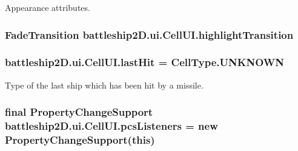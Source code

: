 Appearance attributes. 

\hypertarget{classbattleship2D_1_1ui_1_1CellUI_a5abb394f8190a79f8cb0d6b352af6333}{
\subsubsection[{highlight\-Transition}]{\setlength{\rightskip}{0pt plus 5cm}Fade\-Transition battleship2\-D.\-ui.\-Cell\-U\-I.\-highlight\-Transition\hspace{0.3cm}{\ttfamily [private]}}}\label{classbattleship2D_1_1ui_1_1CellUI_a5abb394f8190a79f8cb0d6b352af6333}
\hypertarget{classbattleship2D_1_1ui_1_1CellUI_a90990b04506f285810963675dfa2c668}{
\subsubsection[{last\-Hit}]{ battleship2\-D.\-ui.\-Cell\-U\-I.\-last\-Hit = {\bf Cell\-Type.\-U\-N\-K\-N\-O\-W\-N}\hspace{0.3cm}{\ttfamily [private]}}}\label{classbattleship2D_1_1ui_1_1CellUI_a90990b04506f285810963675dfa2c668}


Type of the last ship which has been hit by a missile. 

\hypertarget{classbattleship2D_1_1ui_1_1CellUI_af26c7ea10eff42c4a67c9395454e4e9a}{
\subsubsection[{pcs\-Listeners}]{\setlength{\rightskip}{0pt plus 5cm}final Property\-Change\-Support battleship2\-D.\-ui.\-Cell\-U\-I.\-pcs\-Listeners = new Property\-Change\-Support(this)\hspace{0.3cm}{\ttfamily [private]}}}\label{classbattleship2D_1_1ui_1_1CellUI_af26c7ea10eff42c4a67c9395454e4e9a}


